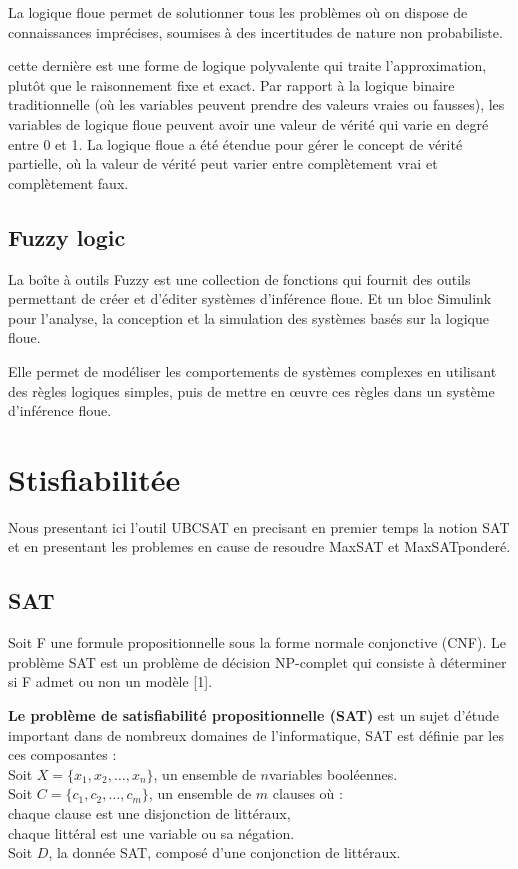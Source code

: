 La logique floue permet de solutionner tous les problèmes où on dispose de connaissances imprécises, soumises à des incertitudes de nature non probabiliste.

cette dernière est une forme de logique polyvalente qui traite l’approximation, plutôt que le raisonnement fixe et exact. Par rapport à la logique binaire traditionnelle (où les variables peuvent prendre des valeurs vraies ou fausses), les variables de logique floue peuvent avoir une valeur de vérité qui varie en degré entre 0 et 1. La logique floue a été étendue pour gérer le concept de vérité partielle, où la valeur de vérité peut varier entre complètement vrai et complètement faux. 
\subsection{Fuzzy logic}

La boîte à outils  Fuzzy est une collection de fonctions qui fournit des outils permettant de créer et d'éditer systèmes d'inférence floue. Et un bloc Simulink pour l'analyse, la conception et la simulation des systèmes basés sur la logique floue.

Elle permet de modéliser les comportements de systèmes complexes en utilisant des règles logiques simples, puis de mettre en œuvre ces règles dans un système d'inférence floue.

\section{Stisfiabilitée}

Nous presentant ici l'outil UBCSAT en precisant en premier temps la notion SAT et en presentant les problemes en cause de resoudre MaxSAT et MaxSATponderé. 
\subsection{SAT}
Soit F une formule propositionnelle sous la forme normale conjonctive (CNF). Le problème SAT est un problème de décision NP-complet qui consiste à déterminer si F admet ou non un modèle [1].

\textbf{Le problème de satisfiabilité propositionnelle (SAT)} est un sujet d'étude important dans de nombreux domaines de l'informatique, SAT est définie par les ces composantes :\\
\hspace{2em}Soit $X=\{x_1, x_2,\dots, x_n\}$, un ensemble de $n$variables booléennes.\\
\hspace{2em}Soit $C=\{c_1, c_2,\dots, c_m\}$, un ensemble de $m$ clauses où :\\
\hspace{2em}chaque clause est une disjonction de littéraux,\\
\hspace{2em}chaque littéral est une variable ou sa négation.\\
\hspace{2em}Soit $D$, la donnée SAT, composé d'une conjonction de littéraux.

